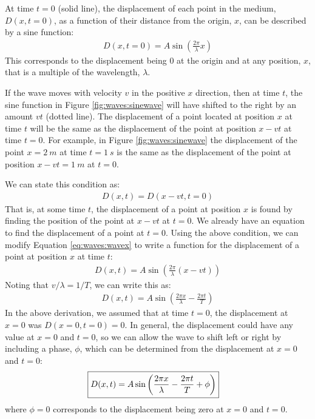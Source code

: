 At time $t=0$ (solid line), the displacement of each point in the medium, $D(x, t=0)$, as a function of their distance from the origin, $x$, can be described by a sine function:
\begin{align} \label{eq:waves:wavex}
D(x,t=0) = A\sin\left( \frac{2\pi}{\lambda}x \right)
\end{align}
This corresponds to the displacement being 0 at the origin and at any position, $x$, that is a multiple of the wavelength, $\lambda$. 

If the wave moves with velocity $v$ in the positive $x$ direction, then at time $t$, the sine function in Figure \ref{fig:waves:sinewave} will have shifted to the right by an amount $vt$ (dotted line). The displacement of a point located at position $x$ at time $t$ will be the same as the displacement of the point at position $x-vt$ at time $t=0$. For example, in Figure \ref{fig:waves:sinewave} the displacement of the point $x=\SI{2}{m}$ at time $t=\SI{1}{s}$ is the same as the displacement of the point at position $x-vt=\SI{1}{m}$ at $t=0$.

 We can state this condition as:
\begin{align*}
D(x,t) = D(x-vt, t=0)
\end{align*} 
That is, at some time $t$, the displacement of a point at position $x$ is found by finding the position of the point at $x-vt$ at $t=0$. We already have an equation to find the displacement of a point at $t=0$.  Using the above condition, we can modify Equation \ref{eq:waves:wavex} to write a function for the displacement of a point at position $x$ at time $t$:
\begin{align*}
D(x,t) = A\sin\left( \frac{2\pi}{\lambda}(x-vt) \right)
\end{align*}
Noting that $v/\lambda= 1/T$, we can write this as:
\begin{align*}
D(x,t) = A\sin\left( \frac{2\pi x}{\lambda}- \frac{2\pi t}{T} \right)
\end{align*}
In the above derivation, we assumed that at time $t=0$, the displacement at $x=0$ was $D(x=0, t=0)=0$. In general, the displacement could have any value at $x=0$ and $t=0$, so we can allow the wave to shift left or right by including a phase, $\phi$, which can be determined from the displacement at $x=0$ and $t=0$:
\begin{align}
\Aboxed{D(x,t) = A\sin\left( \frac{2\pi x}{\lambda}- \frac{2\pi t}{T} + \phi \right)}
\end{align}
where $\phi=0$ corresponds to the displacement being zero at $x=0$ and $t=0$.

